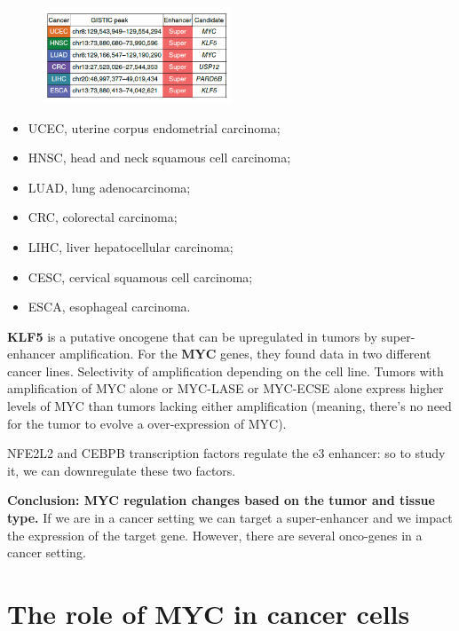 \begin{figure}
\centering
\includegraphics[width=0.5\textwidth]{../_resources/796c982294bedb0a7994a942aa5ff2a5.png}
\caption{}
\label{fig:study}
\end{figure}

\begin{itemize}
\item UCEC, uterine corpus endometrial carcinoma; 
\item HNSC, head and neck squamous cell carcinoma; 
\item LUAD, lung adenocarcinoma; 
\item CRC, colorectal carcinoma; 
\item LIHC, liver hepatocellular carcinoma; 
\item CESC, cervical squamous cell carcinoma; 
\item ESCA, esophageal carcinoma.
\end{itemize}

\textbf{KLF5} is a putative oncogene that can be upregulated in tumors by super-enhancer amplification.
For the \textbf{MYC} genes, they found data in two different cancer lines. Selectivity of amplification depending on the cell line.
Tumors with amplification of MYC alone or MYC-LASE or MYC-ECSE alone express higher levels of MYC than tumors lacking either amplification (meaning, there's no need for the tumor to evolve a over-expression of MYC).

NFE2L2 and CEBPB transcription factors regulate the e3 enhancer: so to study it, we can downregulate these two factors.

\textbf{Conclusion: MYC regulation changes based on the tumor and tissue type.}
If we are in a cancer setting we can target a super-enhancer and we impact the expression of the target gene. However, there are several onco-genes in a cancer setting.

\hypertarget{the-role-of-myc-in-cancer-cells}{%
\section{The role of MYC in cancer cells}\label{the-role-of-myc-in-cancer-cells}}

